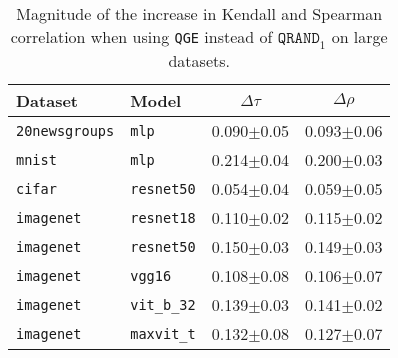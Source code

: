 \begin{table}[!t]%
    \vskip 0.15in
    \begin{center}
    \begin{small}
    \begin{sc}
    \begin{tabular}{l|l|c|c}
        Dataset & Model & $\Delta \tau$ & $\Delta\rho$\\
        \toprule
        \texttt{20newsgroups} & \texttt{mlp} & 0.090$\pm$0.05 & 0.093$\pm$0.06\\
        \texttt{mnist} & \texttt{mlp} & 0.214$\pm$0.04 & 0.200$\pm$0.03\\
        \texttt{cifar} & \texttt{resnet50} & 0.054$\pm$0.04 & 0.059$\pm$0.05\\
        \texttt{imagenet} & \texttt{resnet18} & 0.110$\pm$0.02 & 0.115$\pm$0.02\\
        \texttt{imagenet} & \texttt{resnet50} & 0.150$\pm$0.03 & 0.149$\pm$0.03\\
        \texttt{imagenet} & \texttt{vgg16} & 0.108$\pm$0.08 & 0.106$\pm$0.07\\
        \texttt{imagenet} & \texttt{vit\_b\_32} & 0.139$\pm$0.03 & 0.141$\pm$0.02\\
        \texttt{imagenet} & \texttt{maxvit\_t} & 0.132$\pm$0.08 & 0.127$\pm$0.07\\
        \bottomrule
    \end{tabular}
    \end{sc}
    \end{small}
    \end{center}
    \caption{Magnitude of the increase in Kendall and Spearman correlation when using \texttt{QGE} instead of $\texttt{QRAND}_1$ on large datasets.}\label{tab:effects_per_model_and_dataset_chunky}
\end{table}

